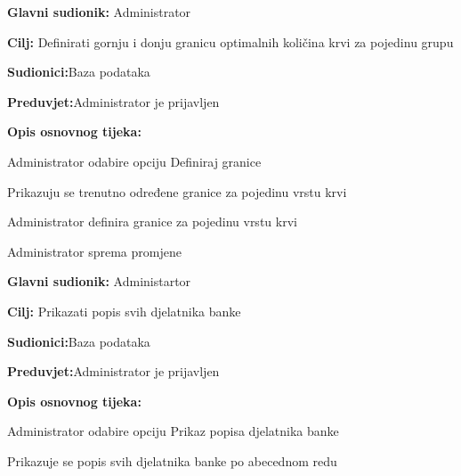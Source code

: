 \noindent {}
\begin{packed_item}
	
	\item \textbf{Glavni sudionik: }{Administrator}
	\item  \textbf{Cilj:} {Definirati gornju i donju granicu optimalnih količina krvi za pojedinu grupu}
	\item  \textbf{Sudionici:}{Baza podataka}
	\item  \textbf{Preduvjet:}{Administrator je prijavljen}
	\item  \textbf{Opis osnovnog tijeka:}
	
	\item[] \begin{packed_enum}
		
		\item {Administrator odabire opciju Definiraj granice}
		\item {Prikazuju se trenutno određene granice za pojedinu vrstu krvi} 
		\item {Administrator definira granice za pojedinu vrstu krvi}
		\item {Administrator sprema promjene}
		
	\end{packed_enum}
\end{packed_item}

\noindent {}
\begin{packed_item}
	
	\item \textbf{Glavni sudionik: }{Administartor}
	\item  \textbf{Cilj:} {Prikazati popis svih djelatnika banke}
	\item  \textbf{Sudionici:}{Baza podataka} 
	\item  \textbf{Preduvjet:}{Administrator je prijavljen}
	\item  \textbf{Opis osnovnog tijeka:}
	
	\item[] \begin{packed_enum}
		
		\item {Administrator odabire opciju Prikaz popisa djelatnika banke}
		\item {Prikazuje se popis svih djelatnika banke po abecednom redu}
		\end{packed_enum}
\end{packed_item}

